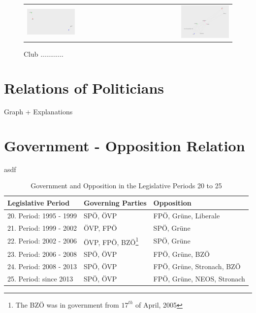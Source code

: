 \begin{figure}
\begin{tabular}{ l r }
	\includegraphics[width=0.49\textwidth]{imgs/graphs/club-graphs/clubs_21} & \includegraphics[width=0.49\textwidth]{imgs/graphs/club-graphs/clubs_25}
\end{tabular}
	\caption{Club ............}
	\label{fig:club_graphs1}
\end{figure}


\section{Relations of Politicians}
Graph + Explanations

\section{Government - Opposition Relation}
\label{sec:gov_opp_relation}

asdf

\begin{table}[h]

\centering
\bgroup
\def\arraystretch{1.2}
\begin{tabular}{| p{4cm} | p{3cm} | l |}
\hline
  Legislative Period & Governing Parties & Opposition  \\
\hline
\hline
  20. Period: 1995 - 1999 & SPÖ, ÖVP & FPÖ, Grüne, Liberale \\
\hline
  21. Period: 1999 - 2002 & ÖVP, FPÖ & SPÖ, Grüne \\
\hline
  22. Period: 2002 - 2006 & ÖVP, FPÖ, BZÖ\footnote{The BZÖ was in government from $17^{th}$ of April, 2005} & SPÖ, Grüne \\
\hline
  23. Period: 2006 - 2008 & SPÖ, ÖVP & FPÖ, Grüne, BZÖ \\
\hline
  24. Period: 2008 - 2013 & SPÖ, ÖVP & FPÖ, Grüne, Stronach, BZÖ \\
\hline
  25. Period: since 2013 & SPÖ, ÖVP & FPÖ, Grüne, NEOS, Stronach \\
\hline

\end{tabular}
\egroup
\caption{Government and Opposition in the Legislative Periods 20 to 25}
\label{table:gov_opp_parties}
\end{table}



